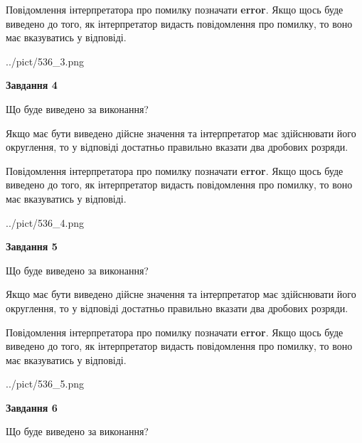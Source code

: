 \documentclass[12pt, ukrainian]{article}
\begin{document}
{\begin {Large}
Повідомлення інтерпретатора про помилку позначати \textbf{error}.
Якщо щось буде виведено до того, як інтерпретатор видасть повідомлення про помилку, 
то воно має вказуватись у відповіді. \par

\begin{center}
	{../pict/536_3.png}
\end{center}
\newpage

{\begin {center}\textbf{Завдання 4}\end {center}}\par
Що буде виведено за виконання? \par

Якщо має бути виведено дійсне значення та інтерпретатор має здійснювати його округлення, 
то у відповіді достатньо правильно вказати два дробових розряди.

Повідомлення інтерпретатора про помилку позначати \textbf{error}.
Якщо щось буде виведено до того, як інтерпретатор видасть повідомлення про помилку, 
то воно має вказуватись у відповіді. \par

\begin{center}
	{../pict/536_4.png}
\end{center}
\newpage

{\begin {center}\textbf{Завдання 5}\end {center}}\par
Що буде виведено за виконання? \par

Якщо має бути виведено дійсне значення та інтерпретатор має здійснювати його округлення, 
то у відповіді достатньо правильно вказати два дробових розряди.

Повідомлення інтерпретатора про помилку позначати \textbf{error}.
Якщо щось буде виведено до того, як інтерпретатор видасть повідомлення про помилку, 
то воно має вказуватись у відповіді. \par

\begin{center}
	{../pict/536_5.png}
\end{center}
\newpage

{\begin {center}\textbf{Завдання 6}\end {center}}\par
Що буде виведено за виконання? \par


\end{Large}}
\end{document}

